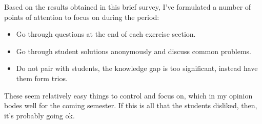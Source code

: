\documentclass[paper=a4,justified,a4paper]{tufte-handout}
\providecommand{\tightlist}{%
  \setlength{\itemsep}{0pt}\setlength{\parskip}{0pt}}
\begin{document}
Based on the results obtained in this brief survey, I've formulated a
number of points of attention to focus on during the period:

\begin{itemize}
\tightlist
\item
  Go through questions at the end of each exercise section.
\item
  Go through student solutions anonymously and discuss common problems.
\item
  Do not pair with students, the knowledge gap is too significant,
  instead have them form trios.
\end{itemize}

These seem relatively easy things to control and focus on, which in my
opinion bodes well for the coming semester. If this is all that the
students disliked, then, it's probably going ok.
\end{document}
